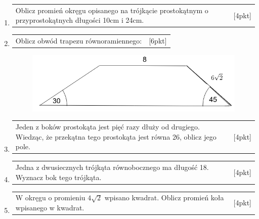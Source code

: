 \documentclass[12pt,a4paper]{article}
\begin{document}
\begin{enumerate}[1.]
		\newpage
		
		\item  \begin{tabular}{p{13cm} r}	%
			Oblicz promień okręgu opisanego na trójkącie prostokątnym o przyprostokątnych długości 10cm i 24cm.&[4pkt]\\ 
		\end{tabular}
		
		\item  \begin{tabular}{p{13cm} r}	%
			Oblicz obwód trapezu równoramiennego: &[6pkt]\\ 
		\end{tabular}
		\begin{figure}[h]
			\includegraphics[scale=0.8]{tp3}
		\end{figure}
		
		\item  \begin{tabular}{p{13cm} r}
			Jeden z boków prostokąta jest pięć razy dłuży od drugiego. Wiedząc, że przekątna tego prostokąta jest równa 26, oblicz jego pole. &[4pkt]\\
		\end{tabular}
		
		\item  \begin{tabular}{p{13cm} r}
			Jedna z dwusiecznych trójkąta równobocznego ma długość 18. Wyznacz bok tego trójkąta. &[4pkt]\\ 
		\end{tabular}
		
		\item  \begin{tabular}{p{13cm} r}
			W okręgu o promieniu $4\sqrt{2}$ wpisano kwadrat. Oblicz promień koła wpisanego w kwadrat. &[4pkt]\\ 
		\end{tabular}
	\end{enumerate}
	
\end{document}
